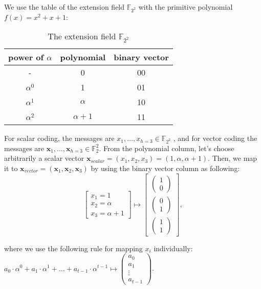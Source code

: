 We use the table of the extension field $\ensuremath{\mathbb{F}}_{2^{2}}$
with the primitive polynomial $f(x)=x^{2}+x+1$:
\begin{center}
\begin{table}

\caption{The extension field $\ensuremath{\mathbb{F}}_{2^{2}}$}

\centering{}%
\begin{tabular}{|c|c|c|}
\hline 
power of $\alpha$ & polynomial & binary vector\tabularnewline
\hline 
- & 0 & 00\tabularnewline
\hline 
$\alpha^{0}$ & 1 & 01\tabularnewline
\hline 
$\alpha^{1}$ & $\alpha$ & 10\tabularnewline
\hline 
$\alpha^{2}$ & $\alpha+1$ & 11\tabularnewline
\hline 
\end{tabular}
\end{table}
For scalar coding, the messages are $x_{1},\ldots,x_{h=3}\in\ensuremath{\mathbb{F}}_{2^{2}}$
, and for vector coding the messages are $\boldsymbol{x}_{1},\ldots,\boldsymbol{x}_{h=3}\in\ensuremath{\mathbb{F}}_{2}^{2}$.
From the polynomial column, let's choose arbitrarily a scalar vector
$\boldsymbol{x}_{scalar}=(x_{1},x_{2},x_{3})=(1,\alpha,\alpha+1)$.
Then, we map it to $\boldsymbol{x}_{vector}=(\boldsymbol{x}_{1},\boldsymbol{x}_{2},\boldsymbol{x}_{3})$
by using the binary vector column as following:
\[
\left[\begin{array}{c}
x_{1}=1\\
x_{2}=\alpha\\
x_{3}=\alpha+1
\end{array}\right]\mapsto\left[\begin{array}{c}
\left(\begin{array}{c}
1\\
0
\end{array}\right)\\
\left(\begin{array}{c}
0\\
1
\end{array}\right)\\
\left(\begin{array}{c}
1\\
1
\end{array}\right)
\end{array}\right],
\]
\par\end{center}

where we use the following rule for mapping $x_{i}$ individually:
$a_{0}\cdot\alpha^{0}+a_{1}\cdot\alpha^{1}+\ldots+a_{t-1}\cdot\alpha^{t-1}\mapsto\left(\begin{array}{c}
a_{0}\\
a_{1}\\
\vdots\\
a_{t-1}
\end{array}\right)$.

